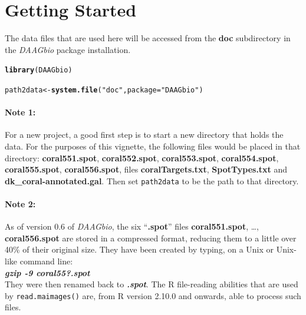 \documentclass[a4paper,9pt]{article}\usepackage[]{graphicx}\usepackage[]{color}
\makeatletter
\newcommand{\hlstr}[1]{\textcolor[rgb]{0.192,0.494,0.8}{#1}}%
\newcommand{\hlstd}[1]{\textcolor[rgb]{0.345,0.345,0.345}{#1}}%
\newcommand{\hlkwb}[1]{\textcolor[rgb]{0.69,0.353,0.396}{#1}}%
\newcommand{\hlkwc}[1]{\textcolor[rgb]{0.333,0.667,0.333}{#1}}%
\newcommand{\hlkwd}[1]{\textcolor[rgb]{0.737,0.353,0.396}{\textbf{#1}}}%
\newenvironment{kframe}{%
 \def\at@end@of@kframe{}%
 \ifinner\ifhmode%
  \def\at@end@of@kframe{\end{minipage}}%
  \begin{minipage}{\columnwidth}%
 \fi\fi%
 \def\FrameCommand##1{\hskip\@totalleftmargin \hskip-\fboxsep
 \colorbox{shadecolor}{##1}\hskip-\fboxsep
     \hskip-\linewidth \hskip-\@totalleftmargin \hskip\columnwidth}%
 \MakeFramed {\advance\hsize-\width
   \@totalleftmargin\z@ \linewidth\hsize
   \@setminipage}}%
 {\par\unskip\endMakeFramed%
 \at@end@of@kframe}
\newenvironment{knitrout}{}{} %
\makeatother
\begin{document}
\section{Getting Started}

The data files that are used here will be accessed from the {\bf doc}
subdirectory in the {\em DAAGbio} package installation.
\begin{knitrout}
\color{fgcolor}\begin{kframe}
\begin{alltt}
\hlkwd{library}\hlstd{(DAAGbio)}
\end{alltt}


{\ttfamily\noindent\itshape\color{messagecolor}{\#\# Loading required package: limma}}\begin{alltt}
\hlstd{path2data} \hlkwb{<-} \hlkwd{system.file}\hlstd{(}\hlstr{"doc"}\hlstd{,} \hlkwc{package}\hlstd{=}\hlstr{"DAAGbio"}\hlstd{)}
\end{alltt}
\end{kframe}
\end{knitrout}

\paragraph{Note 1:} For a new project, a good first step is to start a
new directory that holds the data.  For the purposes of this vignette,
the following files would be placed in that directory:
\textbf{coral551.spot}, \textbf{coral552.spot},
\textbf{coral553.spot}, \textbf{coral554.spot},
\textbf{coral555.spot}, \textbf{coral556.spot}, files
\textbf{coralTargets.txt}, \textbf{SpotTypes.txt} and
\textbf{dk\_coral-annotated.gal}. Then set \texttt{path2data} to be
the path to that directory.

\paragraph{Note 2:} As of version 0.6 of \textit{DAAGbio}, the six
``\textbf{.spot}'' files \textbf{coral551.spot}, \ldots,
\textbf{coral556.spot} are stored in a compressed format, reducing
them to a little over 40\% of their original size. They have been
created by typing, on a Unix or Unix-like command line:\\[4pt]
\textbf{\em gzip -9 coral55?.spot}\\[4pt]
They were then renamed back to \textbf{\em *.spot}. The R file-reading
abilities that are used by \texttt{read.maimages()} are, from R
version 2.10.0 and onwards, able to process such files.
\end{document}
